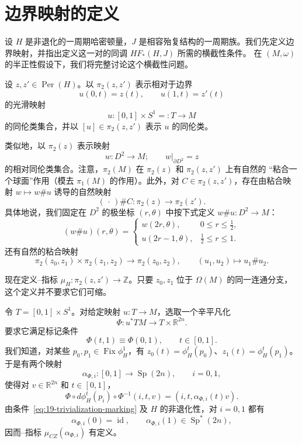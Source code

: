 \section{\personFloer{}边界映射的定义}
\label{sec:def-hamiltonian-floer-boundary}

设 $H$ 是非退化的一周期哈密顿量，$J$ 是相容殆复结构的一周期族。我们先定义\personFloer{}边界映射，并指出定义这一对的\personFloer{}同调 $HF_*(H,J)$ 所需的横截性条件。
在 $(M,\omega)$ 的半正性假设下，我们将完整讨论这个横截性问题。

\begin{definition}
\label{def:relative-cylinder-homotopy-class}
设 $z,z'\in\operatorname{Per}(H)$。以 $\pi_2(z,z')$ 表示相对于边界
\[
 u(0,t)=z(t),\qquad u(1,t)=z'(t)
\]
的光滑映射
\[
 u:[0,1]\times S^1=:T\longrightarrow M
\]
的同伦类集合，并以 $[u]\in\pi_2(z,z')$ 表示 $u$ 的同伦类。
\end{definition}

类似地，以 $\pi_2(z)$ 表示映射
\[
 w:D^2\longrightarrow M;\qquad w|_{\partial D^2}=z
\]
的相对同伦类集合。注意，$\pi_2(M)$ 在 $\pi_2(z)$ 和 $\pi_2(z,z')$ 上有自然的
“粘合一个球面”作用（模去 $\pi_1(M)$ 的作用）。此外，对
$C\in\pi_2(z,z')$，存在由粘合映射 $w\mapsto w\#u$ 诱导的自然映射
\[
 (\,\cdot\,)\#C:\pi_2(z)\longrightarrow\pi_2(z').
\]
具体地说，我们固定在 $D^2$ 的极坐标 $(r,\theta)$ 中按下式定义
$w\#u:D^2\to M$：
\begin{equation}
 (w\#u)(r,\theta)=
 \begin{cases}
  w(2r,\theta),&0\leq r\leq\frac12,\\
  u(2r-1,\theta),&\frac12\leq r\leq1.
 \end{cases}
\label{eq:19-disc-cylinder-gluing}
\end{equation}
还有自然的粘合映射
\[
 \pi_2(z_0,z_1)\times\pi_2(z_1,z_2)\longrightarrow\pi_2(z_0,z_2),
 \qquad (u_1,u_2)\longmapsto u_1\#u_2.
\]

现在定义\personConley{}--\personZehnder{}指标
$\mu_H:\pi_2(z,z')\to\mathbb Z$。只要 $z_0,z_1$ 位于 $\Omega(M)$ 的同一连通分支，
这个定义并不要求它们可缩。

令 $T=[0,1]\times S^1$。对给定映射 $u:T\to M$，选取一个辛平凡化
\[
 \Phi:u^*TM\longrightarrow T\times\mathbb R^{2n}.
\]
要求它满足标记条件
\begin{equation}
 \Phi(t,1)\equiv\Phi(0,1),\qquad t\in[0,1].
\label{eq:19-trivialization-marking}
\end{equation}
我们知道，对某些 $p_0,p_1\in\operatorname{Fix}\phi_H^1$，有
$z_0(t)=\phi_H^t(p_0)$、$z_1(t)=\phi_H^t(p_1)$。于是有两个映射
\[
 \alpha_{\Phi,i}:[0,1]\longrightarrow\operatorname{Sp}(2n),\qquad i=0,1,
\]
使得对 $v\in\mathbb R^{2n}$ 和 $t\in[0,1]$，
\[
 \Phi\circ d\phi_H^t(p_i)\circ\Phi^{-1}(i,t,v)
 =(i,t,\alpha_{\Phi,i}(t)v).
\]
由条件~\eqref{eq:19-trivialization-marking} 及 $H$ 的非退化性，对 $i=0,1$ 都有
\[
 \alpha_{\Phi,i}(0)=\operatorname{id},\qquad
 \alpha_{\Phi,i}(1)\in\operatorname{Sp}^*(2n),
\]
因而\personConley{}--\personZehnder{}指标 $\mu_{CZ}(\alpha_{\Phi,i})$ 有定义。

